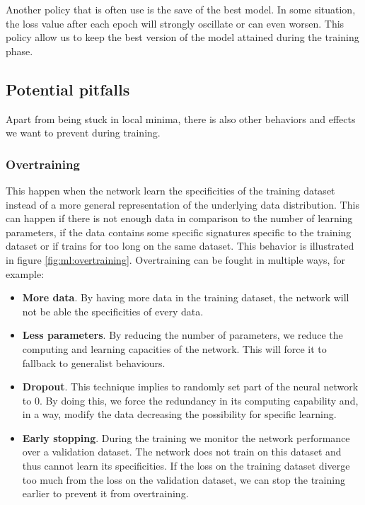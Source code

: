 \documentclass[../main.tex]{subfiles}
\begin{document}
Another policy that is often use is the save of the best model. In some situation, the loss value after each epoch will strongly oscillate or can even worsen. This policy allow us to keep the best version of the model attained during the training phase.

\subsection{Potential pitfalls}
\label{sec:ml:pitfall}

Apart from being stuck in local minima, there is also other behaviors and effects we want to prevent during training.

\subsubsection{Overtraining}
This happen when the network learn the specificities of the training dataset instead of a more general representation of the underlying data distribution. This can happen if there is not enough data in comparison to the number of learning parameters, if the data contains some specific signatures specific to the training dataset or if trains for too long on the same dataset. This behavior is illustrated in figure \ref{fig:ml:overtraining}. Overtraining can be fought in multiple ways, for example:
\begin{itemize}
  \item \textbf{More data}. By having more data in the training dataset, the network will not be able the specificities of every data.
  \item \textbf{Less parameters}. By reducing the number of parameters, we reduce the computing and learning capacities of the network. This will force it to fallback to generalist behaviours.
  \item \textbf{Dropout}. This technique implies to randomly set part of the neural network to 0. By doing this, we force the redundancy in its computing capability and, in a way, modify the data decreasing the possibility for specific learning.
  \item \textbf{Early stopping}. During the training we monitor the network performance over a validation dataset. The network does not train on this dataset and thus cannot learn its specificities. If the loss on the training dataset diverge too much from the loss on the validation dataset, we can stop the training earlier to prevent it from overtraining.
\end{itemize}
\end{document}
